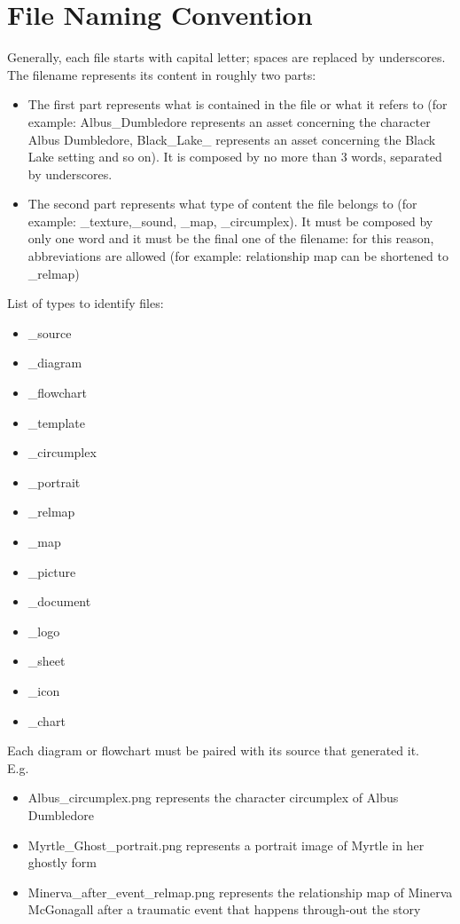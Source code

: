 \section{File Naming Convention}
Generally, each file starts with capital letter; spaces are replaced by underscores.
The filename represents its content in roughly two parts:

		\begin{itemize}
			\item The first part represents what is contained in the file or what it refers to (for example: Albus\_Dumbledore represents an asset concerning the character Albus Dumbledore, Black\_Lake\_ represents an asset concerning the Black Lake setting and so on). It is composed by no more than 3 words, separated by underscores.
			\item The second part represents what type of content the file belongs to (for example: \_texture,\_sound, \_map, \_circumplex). It must be composed by only one word and it must be the final one of the filename: for this reason, abbreviations are allowed (for example: relationship map can be shortened to \_relmap) 
	
			\end{itemize}

List of types to identify files:
		\begin{itemize}
			\item \_source
			\item \_diagram
			\item \_flowchart
			\item \_template
			\item \_circumplex
			\item \_portrait
			\item \_relmap
			\item \_map
			\item \_picture
			\item \_document
			\item \_logo
			\item \_sheet
			\item \_icon
			\item \_chart
		\end{itemize}

Each diagram or flowchart must be paired with its source that generated it. \\

E.g.

\begin{itemize}
			\item Albus\_circumplex.png represents the character circumplex of Albus Dumbledore
			\item Myrtle\_Ghost\_portrait.png represents a portrait image of Myrtle in her ghostly form
			\item Minerva\_after\_event\_relmap.png represents the relationship map of Minerva McGonagall after a traumatic event that happens through-out the story
\end{itemize}

